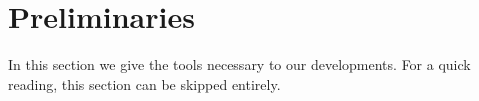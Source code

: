\section{Preliminaries}\label{sec:preliminaries}

In this section we give the tools necessary to our developments. For a quick
reading, this section can be skipped entirely.





